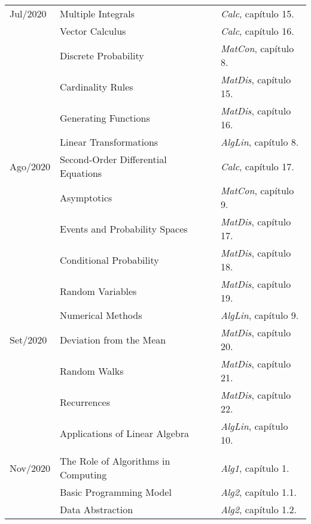 \documentclass[a4paper]{inzane_syllabus} %
\begin{document}
\begin{center}
\begin{tabularx}{\textwidth}{p{2cm}p{8cm}p{9.5cm}}
\arrayrulecolor{maingray}\hline
Jul/2020 & Multiple Integrals      & \emph{Calc},   capítulo 15. \\
         & Vector Calculus         & \emph{Calc},   capítulo 16. \\
         & Discrete Probability    & \emph{MatCon}, capítulo 8.  \\
         & Cardinality Rules       & \emph{MatDis}, capítulo 15. \\
         & Generating Functions    & \emph{MatDis}, capítulo 16. \\
         & Linear Transformations  & \emph{AlgLin}, capítulo 8.  \\

\arrayrulecolor{maingray}\hline
Ago/2020 & Second-Order Differential Equations  & \emph{Calc},   capítulo 17. \\
         & Asymptotics                          & \emph{MatCon}, capítulo 9.  \\
         & Events and Probability Spaces        & \emph{MatDis}, capítulo 17. \\
         & Conditional Probability              & \emph{MatDis}, capítulo 18. \\
         & Random Variables                     & \emph{MatDis}, capítulo 19. \\
         & Numerical Methods                    & \emph{AlgLin}, capítulo 9.  \\

\arrayrulecolor{maingray}\hline
Set/2020 & Deviation from the Mean         & \emph{MatDis}, capítulo 20. \\
         & Random Walks                    & \emph{MatDis}, capítulo 21. \\
         & Recurrences                     & \emph{MatDis}, capítulo 22. \\
         & Applications of Linear Algebra  & \emph{AlgLin}, capítulo 10. \\

\arrayrulecolor{maingray}\hline
 
         
         
         

\arrayrulecolor{maingray}\hline
 
         

\arrayrulecolor{myCOLOR}\hline
\multicolumn{2}{l}{\textbf{\textcolor{myCOLOR}{\large MÓDULO 2: Algoritmos }}} \\
\hline
Nov/2020 & The Role of Algorithms in Computing  & \emph{Alg1}, capítulo 1.   \\
         & Basic Programming Model              & \emph{Alg2}, capítulo 1.1. \\
         & Data Abstraction                     & \emph{Alg2}, capítulo 1.2. \\


\end{tabularx}
\end{center}
\end{document}
